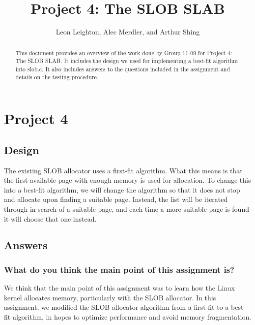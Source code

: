 \documentclass[journal, letterpaper, draftclsnofoot, onecolumn, 10pt]{IEEEtran}
\begin{document}
\title{Project 4: The SLOB SLAB}
\author{Leon Leighton, Alec Merdler, and Arthur Shing}

\begin{titlepage}
    \centering
    \maketitle
    \begin{abstract}
      This document provides an overview of the work done by Group 11-09 for Project 4: The SLOB SLAB.
      It includes the design we used for implementing a best-fit algorithm into slob.c.
      It also includes answers to the questions included in the assignment and details on the testing procedure.
    \end{abstract}


\end{titlepage}
\tableofcontents
\clearpage

\section{Project 4}

\subsection{Design}

The existing SLOB allocator uses a first-fit algorithm. What this means is that the first available page with enough memory is used for allocation.
To change this into a best-fit algorithm, we will change the algorithm so that it does not stop and allocate upon finding a suitable page.
Instead, the list will be iterated through in search of a suitable page, and each time a more suitable page is found it will choose that one instead.


\subsection{Answers}

\subsubsection{What do you think the main point of this assignment is?}

We think that the main point of this assignment was to learn how the Linux kernel allocates memory, particularly with the SLOB allocator.
In this assignment, we modified the SLOB allocator algorithm from a first-fit to a best-fit algorithm, in hopes to optimize performance and avoid memory fragmentation. \\
\end{document}
